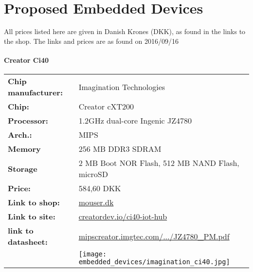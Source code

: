 \chapter{Proposed Embedded Devices}\label{app:embedded_devices}

All prices listed here are given in Danish Krones (DKK),
as found in the links to the shop.
The links and prices are as found on 2016/09/16


\subsubsection*{Creator Ci40}
\begin{tabular}{ l l }

	\textbf{Chip manufacturer:} &
	Imagination Technologies \\

	\textbf{Chip:} &
	Creator cXT200 \\

	\textbf{Processor:} &
	1.2GHz dual-core Ingenic JZ4780 \\

	\textbf{Arch.:} &
	MIPS \\

	\textbf{Memory} &
	256 MB DDR3 SDRAM \\

	\textbf{Storage} &
	2 MB Boot NOR Flash, 512 MB NAND Flash, microSD \\

	\textbf{Price:} &
	584,60 DKK \\

	\textbf{Link to shop:} &
	\href{http://www.mouser.dk/search/ProductDetail.aspx?R=0virtualkey0virtualkeyVL-62913}{mouser.dk} \\

	\textbf{Link to site:} &
	\href{http://www.creatordev.io/ci40-iot-hub}{creatordev.io/ci40-iot-hub} \\

	\textbf{link to datasheet:} &
	\href{http://mipscreator.imgtec.com/CI20/hardware/soc/JZ4780_PM.pdf}{mipscreator.imgtec.com/.../JZ4780\_PM.pdf} \\

	&
	\texttt{[image: embedded\_devices/imagination\_ci40.jpg]} \\

\end{tabular}


